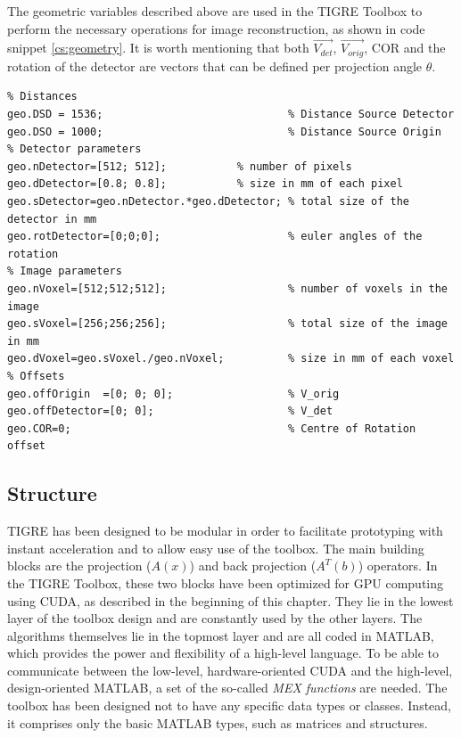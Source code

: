The geometric variables described above are used in the TIGRE Toolbox to perform the necessary operations for image reconstruction, as shown in code snippet \ref{cs:geometry}. It is worth mentioning that both $\overrightarrow{V_{det}}$, $\overrightarrow{V_{orig}}$, COR and the rotation of the detector are vectors that can be defined per projection angle $\theta$.
\FloatBarrier
\begin{lstlisting}[style=Matlab-editor,
basicstyle=\scriptsize,
caption= Geometry definition in TIGRE,
label={cs:geometry},
frame = single
]
%% Geometry structure definition.
% Distances
geo.DSD = 1536;                      	    % Distance Source Detector
geo.DSO = 1000;                     	    % Distance Source Origin
% Detector parameters
geo.nDetector=[512; 512];		    % number of pixels 
geo.dDetector=[0.8; 0.8]; 		    % size in mm of each pixel
geo.sDetector=geo.nDetector.*geo.dDetector; % total size of the detector in mm
geo.rotDetector=[0;0;0];                    % euler angles of the rotation 
% Image parameters
geo.nVoxel=[512;512;512];                   % number of voxels in the image
geo.sVoxel=[256;256;256];                   % total size of the image in mm
geo.dVoxel=geo.sVoxel./geo.nVoxel;          % size in mm of each voxel
% Offsets
geo.offOrigin  =[0; 0; 0];                  % V_orig
geo.offDetector=[0; 0];                     % V_det
geo.COR=0;                                  % Centre of Rotation offset

\end{lstlisting}

\subsection{Structure}

TIGRE has been designed to be modular in order to facilitate prototyping with instant acceleration and to allow easy use of the toolbox. The main building blocks are the projection ($A(x)$) and back projection ($A^T(b)$) operators. In the TIGRE Toolbox, these two blocks have been optimized for GPU computing using CUDA, as described in the beginning of this chapter. They lie in the lowest layer of the toolbox design and are constantly used by the other layers. The algorithms themselves lie in the topmost layer and are all coded in MATLAB, which provides the power and flexibility of a high-level language. To be able to communicate between the low-level, hardware-oriented CUDA and the high-level, design-oriented MATLAB, a set of the so-called \textit{MEX functions} are needed. The toolbox has been designed not to have any specific data types or classes. Instead, it comprises only the basic MATLAB types, such as matrices and structures.

